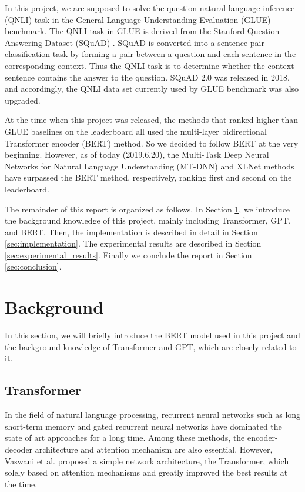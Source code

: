 \documentclass[10pt,journal,compsoc]{IEEEtran}
\begin{document}
In this project, we are supposed to solve the question natural language inference (QNLI) task in the General Language Understanding Evaluation (GLUE) \cite{wang2018glue} benchmark. The QNLI task in GLUE is derived from the Stanford Question Answering Dataset (SQuAD) \cite{rajpurkar2016squad}. SQuAD is converted into a sentence pair classification task by forming a pair between a question and each sentence in the corresponding context. Thus the QNLI task is to determine whether the context sentence contains the answer to the question. SQuAD 2.0 \cite{rajpurkar2018know} was released in 2018, and accordingly, the QNLI data set currently used by GLUE benchmark was also upgraded.

At the time when this project was released, the methods that ranked higher than GLUE baselines on the leaderboard all used the multi-layer bidirectional Transformer encoder (BERT) \cite{devlin2018bert} method. So we decided to follow BERT at the very beginning. However, as of today (2019.6.20), the Multi-Task Deep Neural Networks for Natural Language Understanding (MT-DNN) \cite{liu2019multi} \cite{liu2019improving} and XLNet \cite{yang2019xlnet} methods have surpassed the BERT method, respectively, ranking first and second on the leaderboard.

The remainder of this report is organized as follows. In Section \ref{sec:background}, we introduce the background knowledge of this project, mainly including Transformer, GPT, and BERT. Then, the implementation is described in detail in Section \ref{sec:implementation}. The experimental results are described in Section \ref{sec:experimental_results}. Finally we conclude the report in Section \ref{sec:conclusion}.

\section{Background}
\label{sec:background}

In this section, we will briefly introduce the BERT model used in this project and the background knowledge of Transformer and GPT, which are closely related to it.

\subsection{Transformer}
\label{subsec:transformer}

In the field of natural language processing, recurrent neural networks such as long short-term memory \cite{hochreiter1997long} and gated recurrent neural networks \cite{chung2014empirical} have dominated the state of art approaches for a long time. Among these methods, the encoder-decoder architecture and attention mechanism are also essential. However, Vaswani et al. \cite{vaswani2017attention} proposed a simple network architecture, the Transformer, which solely based on attention mechanisms and greatly improved the best results at the time.
\end{document}

